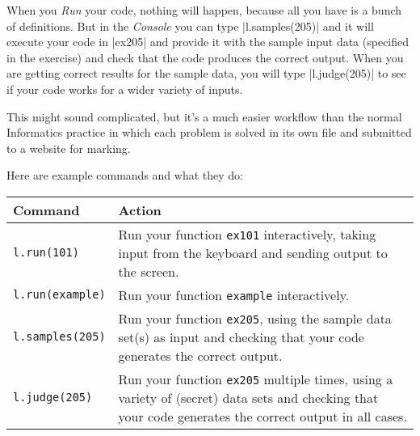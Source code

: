 When you \emph{Run} your code, nothing will happen, because all you have is a bunch of
definitions. But in the \emph{Console} you can type \pycode|l.samples(205)| and it will
execute your code in \pycode|ex205| and provide it with the sample input data (specified
in the exercise) and check that the code produces the correct output. When you are getting
correct results for the sample data, you will type \pycode|l.judge(205)| to see if your
code works for a wider variety of inputs.

This might sound complicated, but it's a much easier workflow than the normal Informatics
practice in which each problem is solved in its own file and submitted to a website for
marking.

Here are example commands and what they do:
\begin{center}
  \begin{tabular}{lp{10cm}}
    \toprule
    \textbf{Command} & \textbf{Action} \\
    \midrule
    \texttt{l.run(101)}     & Run your function \texttt{ex101} interactively, taking
                              input from the keyboard and sending output to the
                              screen.\\[3pt]
    \texttt{l.run(example)} & Run your function \texttt{example} interactively.\\[3pt]
    \texttt{l.samples(205)} & Run your function \texttt{ex205}, using the sample data
                              set(s) as input and checking that your code generates
                              the correct output.\\[3pt]
    \texttt{l.judge(205)}   & Run your function \texttt{ex205} multiple times, using a
                              variety of (secret) data sets and checking that your code
                              generates the correct output in all cases.\\
    \bottomrule
  \end{tabular}
\end{center}

